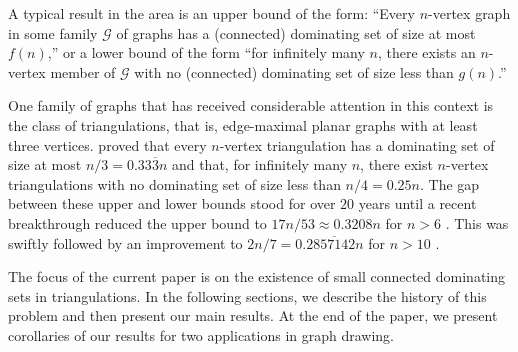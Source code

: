 \documentclass{patmorin}
\begin{document}
A typical result in the area is an upper bound of the form: ``Every $n$-vertex graph in some family $\mathcal{G}$ of graphs has a (connected) dominating set of size at most $f(n)$,'' or a lower bound of the form ``for infinitely many $n$, there exists an $n$-vertex member of $\mathcal{G}$ with no (connected) dominating set of size less than $g(n)$.''

One family of graphs that has received considerable attention in this context is the class of triangulations, that is, edge-maximal planar graphs with at least three vertices. \citet{matheson.tarjan:dominating} proved that every $n$-vertex triangulation has a dominating set of size at most $n/3=0.33\overline{3}n$ and that, for infinitely many $n$, there exist $n$-vertex triangulations with no dominating set of size less than $n/4=0.25n$. The gap between these upper and lower bounds stood for over $20$ years until a recent breakthrough reduced the upper bound to $17n/53\approx 0.3208n$ for $n>6$ \cite{spacapan:domination}.  This was swiftly followed by an improvement to $2n/7= 0.2\overline{857142}n$ for $n>10$  \cite{christiansen.rotenberg.ea:triangulations}.

The focus of the current paper is on the existence of small connected dominating sets in triangulations. In the following sections, we describe the history of this problem and then present our main results. At the end of the paper, we present corollaries of our results for two applications in graph drawing. 
\end{document}
